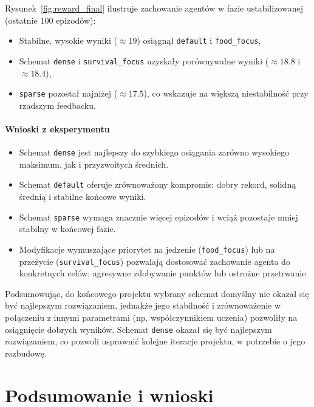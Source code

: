 \documentclass[a4paper,12pt]{article}
\begin{document}
Rysunek~\ref{fig:reward_final} ilustruje zachowanie agentów w fazie ustabilizowanej (ostatnie 100 epizodów):
\begin{itemize}
  \item Stabilne, wysokie wyniki (\(\approx19\)) osiągnął \texttt{default} i \texttt{food\_focus},
  \item Schemat \texttt{dense} i \texttt{survival\_focus} uzyskały porównywalne wyniki (\(\approx18.8\) i \(\approx18.4\)),
  \item \texttt{sparse} pozostał najniżej (\(\approx17.5\)), co wskazuje na większą niestabilność przy rzadszym feedbacku.
\end{itemize}

\paragraph{Wnioski z eksperymentu}
\begin{itemize}
  \item Schemat \texttt{dense} jest najlepszy do szybkiego osiągania zarówno wysokiego maksimum, jak i przyzwoitych średnich.
  \item Schemat \texttt{default} oferuje zrównoważony kompromis: dobry rekord, solidną średnią i stabilne końcowe wyniki.
  \item Schemat \texttt{sparse} wymaga znacznie więcej epizodów i wciąż pozostaje mniej stabilny w końcowej fazie.
  \item Modyfikacje wymuszające priorytet na jedzenie (\texttt{food\_focus}) lub na przeżycie (\texttt{survival\_focus}) pozwalają dostosować zachowanie agenta do konkretnych celów: agresywne zdobywanie punktów lub ostrożne przetrwanie.
\end{itemize}

Podsumowując, do końcowego projektu wybrany schemat domyślny nie okazał się być najlepszym rozwiązaniem, jednakże jego stabilność i zrównoważenie w połączeniu z innymi parametrami (np. współczynnikiem uczenia) pozwoliły na osiągnięcie dobrych wyników. Schemat \texttt{dense} okazał się być najlepszym rozwiązaniem, co pozwoli usprawnić kolejne iteracje projektu, w potrzebie o jego rozbudowę.









\clearpage
  \section{Podsumowanie i wnioski}
\end{document}
